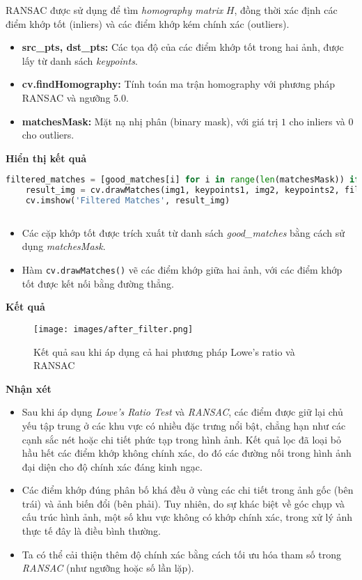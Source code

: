 RANSAC được sử dụng để tìm \textit{homography matrix} \( H \), đồng thời xác định các điểm khớp tốt (inliers) và các điểm khớp kém chính xác (outliers). 

\begin{itemize}
	\item \textbf{src\_pts, dst\_pts:} Các tọa độ của các điểm khớp tốt trong hai ảnh, được lấy từ danh sách \textit{keypoints}.
	\item \textbf{cv.findHomography:} Tính toán ma trận homography với phương pháp RANSAC và ngưỡng \( 5.0 \).
	\item \textbf{matchesMask:} Mặt nạ nhị phân (binary mask), với giá trị \( 1 \) cho inliers và \( 0 \) cho outliers.
\end{itemize}
\textbf{Hiển thị kết quả}
\begin{lstlisting}[language=Python]
	filtered_matches = [good_matches[i] for i in range(len(matchesMask)) if matchesMask[i]]
	result_img = cv.drawMatches(img1, keypoints1, img2, keypoints2, filtered_matches, None, flags=cv.DrawMatchesFlags_NOT_DRAW_SINGLE_POINTS)
    cv.imshow('Filtered Matches', result_img)
	
\end{lstlisting}

\begin{itemize}
	\item Các cặp khớp tốt được trích xuất từ danh sách \textit{good\_matches} bằng cách sử dụng \textit{matchesMask}.
	\item Hàm \texttt{cv.drawMatches()} vẽ các điểm khớp giữa hai ảnh, với các điểm khớp tốt được kết nối bằng đường thẳng.
\end{itemize}

\textbf{Kết quả}

\begin{figure}[H]
	\centering
	\texttt{[image: images/after\_filter.png]}
	\caption{Kết quả sau khi áp dụng cả hai phương pháp Lowe's ratio và RANSAC}
\end{figure}

\textbf{Nhận xét}
\begin{itemize}
	\item Sau khi áp dụng \textit{Lowe's Ratio Test} và \textit{RANSAC}, các điểm được giữ lại chủ yếu tập trung ở các khu vực có nhiều đặc trưng nổi bật, chẳng hạn như các cạnh sắc nét hoặc chi tiết phức tạp trong hình ảnh. Kết quả lọc đã loại bỏ hầu hết các điểm khớp không chính xác, do đó các đường nối trong hình ảnh đại diện cho độ chính xác đáng kinh ngạc.
	\item Các điểm khớp đúng phân bố khá đều ở vùng các chi tiết trong ảnh gốc (bên trái) và ảnh biến đổi (bên phải). Tuy nhiên, do sự khác biệt về góc chụp và cấu trúc hình ảnh, một số khu vực không có khớp chính xác, trong xử lý ảnh thực tế đây là điều bình thường.
	\item Ta có thể cải thiện thêm độ chính xác bằng cách tối ưu hóa tham số trong \textit{RANSAC} (như ngưỡng hoặc số lần lặp).
\end{itemize}


